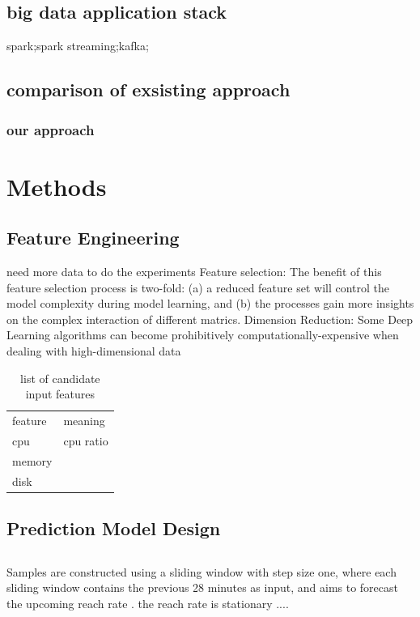 \documentclass[review]{elsarticle}
\newcommand{\dabiaolv}{reach rate }
\begin{document}
\subsection{big data application stack}
spark\cite{ZahariaSpark:Sets};spark streaming\cite{ZahariaDiscretizedClusters};kafka;
\subsection{comparison of exsisting approach}


\subsubsection{our approach}


\section{Methods}
\subsection{Feature Engineering}
need more data to do the experiments
\subsub
Feature selection:  The benefit of this feature selection process is two-fold: (a) a reduced feature set will control the model complexity during model learning, and (b) the processes gain more insights on the complex interaction of different matrics. \cite{Yeom2016Data-DrivenMatrices}
Dimension Reduction:
Some Deep Learning algorithms can become prohibitively computationally-expensive when dealing with high-dimensional data


\begin{table}[]
\centering
\begin{tabular}{ll}
feature & meaning \\
  cpu     &    cpu ratio     \\
  memory  &         \\
   disk   &        
\end{tabular}
\caption{list of candidate input features}
\label{my-label}
\end{table}



\subsection{Prediction Model Design}
\subsection{}
Samples  are  constructed  using  a  sliding  window  with step size one, where each sliding window contains the previous 28 minutes as input, and aims to forecast the upcoming \dabiaolv. the \dabiaolv is stationary ....
\end{document}
